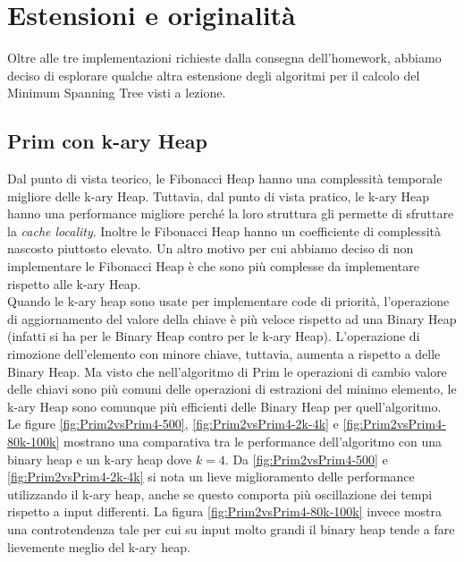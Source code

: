 \section{Estensioni e originalità}
\label{cap:extensions-and-originalities}

Oltre alle tre implementazioni richieste dalla consegna dell'homework, abbiamo deciso di esplorare qualche altra estensione degli algoritmi per il calcolo del Minimum Spanning Tree visti a lezione.

\subsection{Prim con k-ary Heap}


Dal punto di vista teorico, le Fibonacci Heap hanno una complessità temporale migliore delle k-ary Heap.
Tuttavia, dal punto di vista pratico, le k-ary Heap hanno una performance migliore perché la loro struttura gli permette di sfruttare la \textit{cache locality}. Inoltre le Fibonacci Heap hanno un coefficiente di complessità nascosto piuttosto elevato.
Un altro motivo per cui abbiamo deciso di non implementare le Fibonacci Heap è che sono più complesse da implementare rispetto alle k-ary Heap. \\

\noindent Quando le k-ary heap sono usate per implementare code di priorità, l'operazione di aggiornamento del valore della chiave è più veloce rispetto ad una Binary Heap (infatti si ha \complexityLogN{} per le Binary Heap contro \complexityLogkN{} per le k-ary Heap).
L'operazione di rimozione dell'elemento con minore chiave, tuttavia, aumenta a \complexityKLogkN{} rispetto a \complexityLogkN{} delle Binary Heap. Ma visto che nell'algoritmo di Prim le operazioni di cambio valore delle chiavi sono più comuni delle operazioni di estrazioni del minimo elemento, le k-ary Heap sono comunque più efficienti delle Binary Heap per quell'algoritmo. \\

\noindent Le figure \ref{fig:Prim2vsPrim4-500}, \ref{fig:Prim2vsPrim4-2k-4k} e \ref{fig:Prim2vsPrim4-80k-100k} mostrano una comparativa tra le performance
dell'algoritmo con una binary heap e un k-ary heap dove $k = 4$. 
Da \ref{fig:Prim2vsPrim4-500} e \ref{fig:Prim2vsPrim4-2k-4k} si nota
un lieve miglioramento delle performance utilizzando il k-ary heap, 
anche se questo comporta più oscillazione dei tempi rispetto a input
differenti. La figura \ref{fig:Prim2vsPrim4-80k-100k} invece mostra
una controtendenza tale per cui su input molto grandi il binary heap
tende a fare lievemente meglio del k-ary heap.

